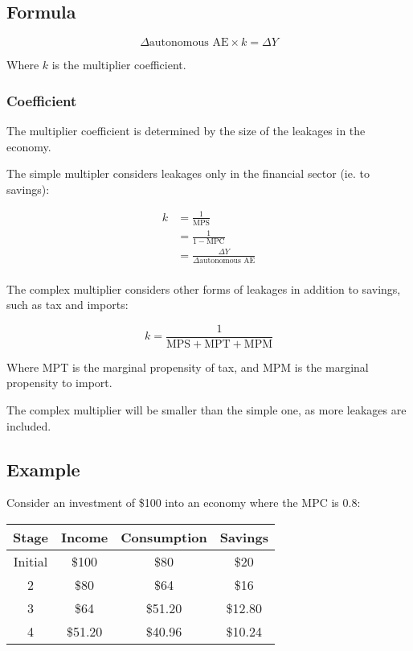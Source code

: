 \documentclass[a4paper,11pt]{article}
\begin{document}
\subsection{Formula}

$$
\Delta \mbox{autonomous AE} \times k = \Delta Y
$$

Where $k$ is the multiplier coefficient.


\subsubsection{Coefficient}

The multiplier coefficient is determined by the size of the leakages in the
economy.

The simple multipler considers leakages only in the financial sector (ie. to
savings):

$$
\begin{aligned}
k & = \frac{1}{\mbox{MPS}} \\
& = \frac{1}{1 - \mbox{MPC}} \\
& = \frac{\Delta Y}{\Delta \mbox{autonomous AE}} \\
\end{aligned}
$$

The complex multiplier considers other forms of leakages in addition to savings,
such as tax and imports:

$$
k = \frac{1}{\mbox{MPS} + \mbox{MPT} + \mbox{MPM}}
$$

Where MPT is the marginal propensity of tax, and MPM is the marginal propensity
to import.

The complex multiplier will be smaller than the simple one, as more leakages
are included.


\subsection{Example}

Consider an investment of \$100 into an economy where the MPC is 0.8:

\begin{center}
\begin{tabular}{c|c c c}
Stage & Income & Consumption & Savings \\
\hline
Initial & \$100   & \$80    & \$20    \\
2       & \$80    & \$64    & \$16    \\
3       & \$64    & \$51.20 & \$12.80 \\
4       & \$51.20 & \$40.96 & \$10.24 \\
\end{tabular}
\end{center}
\end{document}
